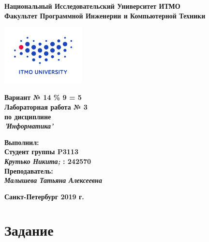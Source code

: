 \documentclass[11pt]{article}
\author{Krutko Nikita / KrutNA}
\date{\today}
\title{}
\begin{document}
\large
\thispagestyle{empty}
\begin{center}
\textbf{Национальный Исследовательский Университет ИТМО}\\
\textbf{Факультет Программной Инженерии и Компьютерной Техники}\\
\end{center}
\vspace{2em}
\begin{center}
\includegraphics[width=120pt]{../itmo-logo.png}
\end{center}
\LARGE
\vspace{5em}
\begin{center}
\textbf{Вариант № 14 \% 9 = 5}\\
\textbf{Лабораторная работа № 3}\\
\Large
\textbf{по дисциплине}\\
\LARGE
\textbf{\emph{'Информатика'}}\\
\end{center}
\vspace{11em}
\large
\begin{flushright}
\textbf{Выполнил:}\\
\textbf{Студент группы P3113}\\
\textbf{\emph{Крутько Никита;} : 242570}\\
\textbf{Преподаватель:}\\
\textbf{\emph{Малышева Татьяна Алексеевна}}\\
\end{flushright}
\vspace{4em}
\large
\begin{center}
\textbf{Санкт-Петербург 2019 г.}
\end{center}
\pagebreak{}
\setcounter{tocdepth}{2}
\tableofcontents
\normalsize
\section{Задание}
\label{sec:org8e82179}
\end{document}
